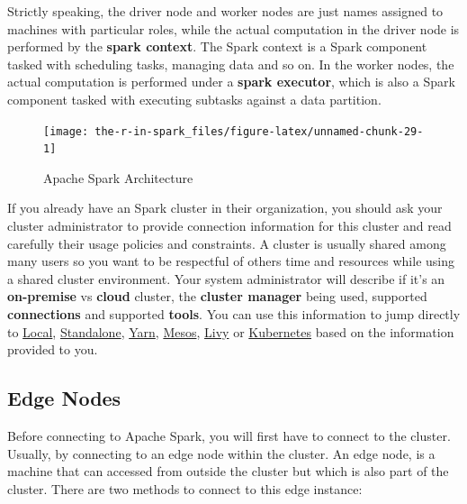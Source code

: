 \documentclass[]{book}
\theoremstyle{definition}
\theoremstyle{definition}
\theoremstyle{definition}
\theoremstyle{remark}
\begin{document}
Strictly speaking, the driver node and worker nodes are just names
assigned to machines with particular roles, while the actual computation
in the driver node is performed by the \textbf{spark context}. The Spark
context is a Spark component tasked with scheduling tasks, managing data
and so on. In the worker nodes, the actual computation is performed
under a \textbf{spark executor}, which is also a Spark component tasked
with executing subtasks against a data partition.

\begin{figure}

{\centering \texttt{[image: the-r-in-spark\_files/figure-latex/unnamed-chunk-29-1]} 

}

\caption{Apache Spark Architecture}\label{fig:unnamed-chunk-29}
\end{figure}

If you already have an Spark cluster in their organization, you should
ask your cluster administrator to provide connection information for
this cluster and read carefully their usage policies and constraints. A
cluster is usually shared among many users so you want to be respectful
of others time and resources while using a shared cluster environment.
Your system administrator will describe if it's an \textbf{on-premise}
vs \textbf{cloud} cluster, the \textbf{cluster manager} being used,
supported \textbf{connections} and supported \textbf{tools}. You can use
this information to jump directly to \protect\hyperlink{local}{Local},
\protect\hyperlink{standalone}{Standalone},
\protect\hyperlink{yarn-1}{Yarn}, \protect\hyperlink{mesos-1}{Mesos},
\protect\hyperlink{livy}{Livy} or
\protect\hyperlink{kubernetes-1}{Kubernetes} based on the information
provided to you.

\hypertarget{edge-nodes}{%
\subsection{Edge Nodes}\label{edge-nodes}}

Before connecting to Apache Spark, you will first have to connect to the
cluster. Usually, by connecting to an edge node within the cluster. An
edge node, is a machine that can accessed from outside the cluster but
which is also part of the cluster. There are two methods to connect to
this edge instance:
\end{document}
